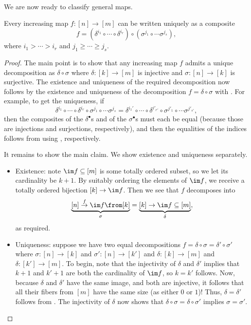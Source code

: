 \documentclass[../notes.tex]{subfiles}
\begin{document}
We are now ready to classify general maps.
\begin{lemma} \label{lem:classify-inc}
	Every increasing map $f\colon[n]\to[m]$ can be written uniquely as a composite
	\[f=(\delta^{i_1}\circ\cdots\circ\delta^{i_r})\circ(\sigma^{j_1}\circ\cdots\sigma^{j_s}),\]
	where $i_1>\cdots>i_r$ and $j_1\ge\cdots\ge j_s$.
\end{lemma}
\begin{proof}
	The main point is to show that any increasing map $f$ admits a unique decomposition as $\delta\circ\sigma$ where $\delta\colon[k]\to[m]$ is injective and $\sigma\colon[n]\to[k]$ is surjective. The existence and uniqueness of the required decomposition now follows by the existence and uniqueness of the decomposition $f=\delta\circ\sigma$ with . For example, to get the uniqueness, if
	\[\delta^{i_1}\circ\cdots\circ\delta^{i_r}\circ\sigma^{j_1}\circ\cdots\sigma^{j_s}=\delta^{i_1'}\circ\cdots\circ\delta^{i'_{r'}}\circ\sigma^{j'_1}\circ\cdots\sigma^{j'_{s'}},\]
	then the composites of the $\delta^\bullet$s and of the $\sigma^\bullet$s must each be equal (because those are injections and surjections, respectively), and then the equalities of the indices follows from using , respectively.

	It remains to show the main claim. We show existence and uniqueness separately.
	\begin{itemize}
		\item Existence: note $\im f\subseteq[m]$ is some totally ordered subset, so we let its cardinality be $k+1$. By suitably ordering the elements of $\im f$, we receive a totally ordered bijection $[k]\to\im f$. Then we see that $f$ decomposes into
		\[\underbrace{[n]\stackrel f\to\im f\from[k]}_{\sigma}=\underbrace{[k]\to\im f\subseteq[m]}_\delta,\]
		as required.
		\item Uniqueness: suppose we have two equal decompositions $f=\delta\circ\sigma=\delta'\circ\sigma'$ where $\sigma\colon[n]\to[k]$ and $\sigma'\colon[n]\to[k']$ and $\delta\colon[k]\to[m]$ and $\delta\colon[k']\to[m]$. To begin, note that the injectivity of $\delta$ and $\delta'$ implies that $k+1$ and $k'+1$ are both the cardinality of $\im f$, so $k=k'$ follows. Now, because $\delta$ and $\delta'$ have the same image, and both are injective, it follows that all their fibers from $[m]$ have the same size (as either $0$ or $1$)! Thus, $\delta=\delta'$ follows from . The injectivity of $\delta$ now shows that $\delta\circ\sigma=\delta\circ\sigma'$ implies $\sigma=\sigma'$.
		\qedhere
	\end{itemize}
\end{proof}
\end{document}
